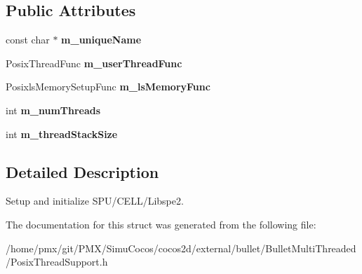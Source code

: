 \subsection*{Public Attributes}
\begin{DoxyCompactItemize}
\item 
\mbox{\label{structPosixThreadSupport_1_1ThreadConstructionInfo_ae1ebb5f21c709a5c8daa8043ad08db24}} 
const char $\ast$ {\bfseries m\+\_\+unique\+Name}
\item 
\mbox{\label{structPosixThreadSupport_1_1ThreadConstructionInfo_a35b4f2d4a84bcb4fc6d281ada1839a32}} 
Posix\+Thread\+Func {\bfseries m\+\_\+user\+Thread\+Func}
\item 
\mbox{\label{structPosixThreadSupport_1_1ThreadConstructionInfo_a797e53245c408c76ad5736d7f34488b1}} 
Posixls\+Memory\+Setup\+Func {\bfseries m\+\_\+ls\+Memory\+Func}
\item 
\mbox{\label{structPosixThreadSupport_1_1ThreadConstructionInfo_a5d365490a2408a08040a5f7c2cc46814}} 
int {\bfseries m\+\_\+num\+Threads}
\item 
\mbox{\label{structPosixThreadSupport_1_1ThreadConstructionInfo_a259f189f4c991e34f76945057b48acdd}} 
int {\bfseries m\+\_\+thread\+Stack\+Size}
\end{DoxyCompactItemize}


\subsection{Detailed Description}
Setup and initialize S\+P\+U/\+C\+E\+L\+L/\+Libspe2. 

The documentation for this struct was generated from the following file\+:\begin{DoxyCompactItemize}
\item 
/home/pmx/git/\+P\+M\+X/\+Simu\+Cocos/cocos2d/external/bullet/\+Bullet\+Multi\+Threaded/Posix\+Thread\+Support.\+h\end{DoxyCompactItemize}
